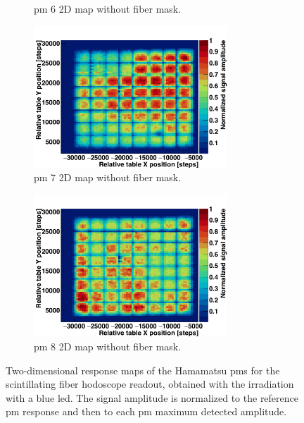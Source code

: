 \begin{figure}
\begin{subfigure}[t]{.5\textwidth}
\caption{\gls{pm} 6 2D map without fiber mask.}
\label{chap3::fig::hodoPMchar2DnoMask_pm6}
\end{subfigure}
\begin{subfigure}[t]{.5\textwidth}
\centering
\includegraphics[width=0.8\textwidth]{03_GraphicFiles/chapter3_CLaRySproto/Hodoscope/PMchar/Maps_noMask/2DMap_PM7_Norm.png}
\caption{\gls{pm} 7 2D map without fiber mask.}
\label{chap3::fig::hodoPMchar2DnoMask_pm7}
\end{subfigure}
\begin{subfigure}[t]{.5\textwidth}
\centering
\includegraphics[width=0.8\textwidth]{03_GraphicFiles/chapter3_CLaRySproto/Hodoscope/PMchar/Maps_noMask/2DMap_PM8_Norm.png}
\caption{\gls{pm} 8 2D map without fiber mask.}
\label{chap3::fig::hodoPMchar2DnoMask_pm8}
\end{subfigure}
\caption{Two-dimensional response maps of the Hamamatsu \glspl{pm} for the scintillating fiber hodoscope readout, obtained with the irradiation with a blue 	\gls{led}. The signal amplitude is normalized to the reference \gls{pm} response and then to each \gls{pm} maximum detected amplitude.}
\label{chap3::fig::hodoPMchar2Dmaps_allPM}
\end{figure}

